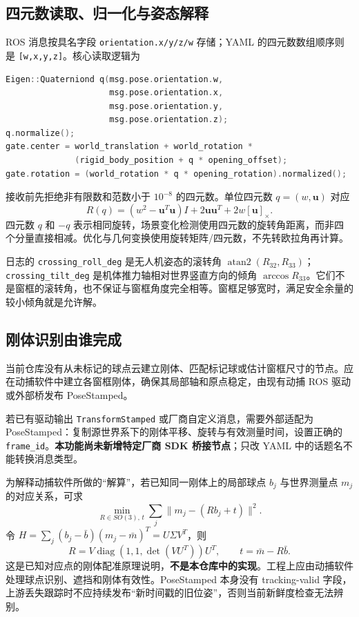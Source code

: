 \documentclass[UTF8,fontset=fandol,a4paper,10pt]{ctexart}
\newcommand{\code}[1]{{\small\nolinkurl{#1}}}
\begin{document}
\subsection{四元数读取、归一化与姿态解释}
ROS 消息按具名字段 \code{orientation.x/y/z/w} 存储；YAML 的四元数数组顺序则是 \code{[w,x,y,z]}。核心读取逻辑为
\begin{lstlisting}[language=C++]
Eigen::Quaterniond q(msg.pose.orientation.w,
                     msg.pose.orientation.x,
                     msg.pose.orientation.y,
                     msg.pose.orientation.z);
q.normalize();
gate.center = world_translation + world_rotation *
              (rigid_body_position + q * opening_offset);
gate.rotation = (world_rotation * q * opening_rotation).normalized();
\end{lstlisting}
接收前先拒绝非有限数和范数小于 $10^{-8}$ 的四元数。单位四元数 $q=(w,\mathbf u)$ 对应
\[
 R(q)=(w^2-\mathbf u^T\mathbf u)I+2\mathbf u\mathbf u^T+2w[\mathbf u]_\times.
\]
四元数 $q$ 和 $-q$ 表示相同旋转，场景变化检测使用四元数的旋转角距离，而非四个分量直接相减。优化与几何变换使用旋转矩阵/四元数，不先转欧拉角再计算。

日志的 \code{crossing_roll_deg} 是无人机姿态的滚转角
$\operatorname{atan2}(R_{32},R_{33})$；\code{crossing_tilt_deg} 是机体推力轴相对世界竖直方向的倾角 $\arccos R_{33}$。它们不是窗框的滚转角，也不保证与窗框角度完全相等。窗框足够宽时，满足安全余量的较小倾角就是允许解。

\subsection{刚体识别由谁完成}
当前仓库没有从未标记的球点云建立刚体、匹配标记球或估计窗框尺寸的节点。应在动捕软件中建立各窗框刚体，确保其局部轴和原点稳定，由现有动捕 ROS 驱动或外部桥发布 PoseStamped。

若已有驱动输出 \code{TransformStamped} 或厂商自定义消息，需要外部适配为 PoseStamped：复制源世界系下的刚体平移、旋转与有效测量时间，设置正确的 \code{frame_id}。\textbf{本功能尚未新增特定厂商 SDK 桥接节点}；只改 YAML 中的话题名不能转换消息类型。

为解释动捕软件所做的“解算”，若已知同一刚体上的局部球点 $b_j$ 与世界测量点 $m_j$ 的对应关系，可求
\[
 \min_{R\in SO(3),\,t}\sum_j\|m_j-(Rb_j+t)\|^2.
\]
令 $H=\sum_j(b_j-\bar b)(m_j-\bar m)^T=U\Sigma V^T$，则
\[
 R=V\operatorname{diag}(1,1,\det(VU^T))U^T,\qquad t=\bar m-R\bar b.
\]
这是已知对应点的刚体配准原理说明，\textbf{不是本仓库中的实现}。工程上应由动捕软件处理球点识别、遮挡和刚体有效性。PoseStamped 本身没有 tracking-valid 字段，上游丢失跟踪时不应持续发布“新时间戳的旧位姿”，否则当前新鲜度检查无法辨别。
\end{document}
